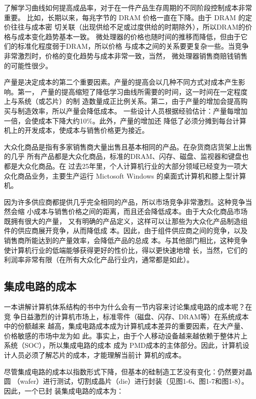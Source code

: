 了解学习曲线如何提高成品率，对于在一件产品生存周期的不同阶段控制成本非常重要。
比如，长期以来，每兆字节的 DRAM 价格一直在下降。由于 DRAM 的定价往往与成本密
切关联（出现供给不足或过度供给的时期除外），所以DRAM的价格与成本变化趋势基本一致。
微处理器的价格也随时间的推移而降低，但由于它们的标准化程度弱于DRAM，所以价格
与成本之间的关系要更复杂一些。当竞争非常激烈时，价格的变化趋势与成本非常一致，当然，
微处理器销售商赔钱销售的可能性很少。

产量是决定成本的第二个重要因素。产量的提高会以几种不同方式对成本产生影响。第一，
产量的提高缩短了降低学习曲线所需要的时间，这一时间在一定程度上与系统（或芯片）的制
造数量成正比例关系。第二，由于产量的增加会提高购买与制造效率，所以产量会降低成本。
一些设计人员根据经验估计：产量每增加一倍，会使成本下降大约10\%。此外，产量的增加还
降低了必须分摊到每台计算机上的开发成本，使成本与销售价格更为接近。

大众化商品是指有多家销售商大量出售且基本相同的产品。在杂货商店货架上出售的几乎
所有产品都是大众化商品，标准的DRAM、闪存、磁盘、监视器和键盘也都是大众化商品。在
过去25年里，个人计算机行业的大部分领域已经变为一项大众化商品业务，主要生产运行
Mictosoft Windows 的桌面式计算机和膝上型计算机。

因为许多供应商都提供几乎完全相同的产品，所以市场竞争非常激烈。这种竞争当然会缩
小成本与销售价格之间的距离，而且还会降低成本。由于大众化商品市场既拥有很大的产量，
又有明确的产品定义，这样可以让那些为大众化产品制造组件的供应商展开竞争，从而降低成
本。因此，由于组件供应商之间的竞争，以及销售商所能达到的产量效率，会降低产品的总成
本。与其他部门相比，这种竞争使计算机行业的低端能够获得更好的性价比，得以更快速地增
长，当然，它们的利润率非常有限（在所有大众化产品行业内，通常都是如此）。

\subsection{集成电路的成本}
一本讲解计算机体系结构的书中为什么会有一节内容来讨论集成电路的成本呢？在竞
争日益激烈的计算机市场上，标准零件（磁盘、闪存、DRAM等）在系统成本中的份额越来
越高，集成电路成本成为计算机成本差异的重要因素，在大产量、价格敏感的市场中龙为如
此。事实上，由于个人移动设备越来越依赖于整体片上系统（SOC），所以集成电路的成本
成为 PMD成本的主体部分。因此，计算机设计人员必须了解芯片的成本，才能理解当前计
算机的成本。

尽管集成电路的成本以指数形式下降，但基本的硅制造工艺没有变化：仍然要对晶圆
（wafer）进行测试，切割成晶片（die）进行封装（见图1-6、图1-7和图1-8）。因此，一个已封
装集成电路的成本为：


